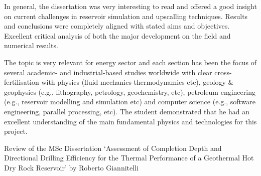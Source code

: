 \documentclass[14pt,twoside]{report}
\begin{document}
In general, the dissertation was very interesting to read and offered a good insight on current challenges in reservoir simulation and upscalling techniques. Results and conclusions were completely aligned with stated aims and objectives. Excellent critical analysis of both the major development on the field and numerical results. 

The topic is very relevant for energy sector and each section has been the focus of several academic- and industrial-based studies worldwide with clear cross-fertilisation with physics (fluid mechanics thermodynamics etc), geology $\&$ geophysics (e.g., lithography, petrology, geochemistry, etc), petroleum engineering (e.g., reservoir modelling and simulation etc) and computer science (e.g., software engineering, parallel processing, etc). The student demonstrated that he had an excellent understanding of the main fundamental physics and technologies for this project.

\clearpage 



\bigskip

\begin{center}
{\Large Review of the MSc Dissertation `Assessment of Completion Depth and Directional Drilling Efficiency for the Thermal Performance of a Geothermal Hot Dry Rock Reservoir' by Roberto Giannitelli}
\end{center}

\medskip
\end{document}
